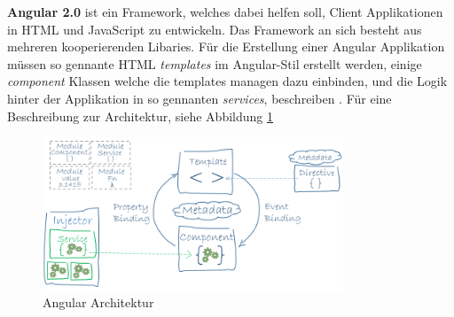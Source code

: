 \textbf{Angular 2.0} ist ein Framework, welches dabei helfen soll, Client Applikationen in HTML und JavaScript zu entwickeln. Das Framework an sich besteht aus mehreren kooperierenden Libaries. Für die Erstellung einer Angular Applikation müssen so gennante HTML \textit{templates} im Angular-Stil erstellt werden, einige \textit{component} Klassen welche die templates managen dazu einbinden, und die Logik hinter der Applikation in so gennanten \textit{services}, beschreiben \cite{MELD.CH3-web-app.angular}. Für eine Beschreibung zur Architektur, siehe Abbildung \ref{fig:angulararch}

\begin{figure}[!htb]\centering
	\includegraphics[width=0.8\textwidth]{images/angular}
	\caption{Angular Architektur \cite{MELD.CH3-web-app.angular}}
	\label{fig:angulararch}
\end{figure}



